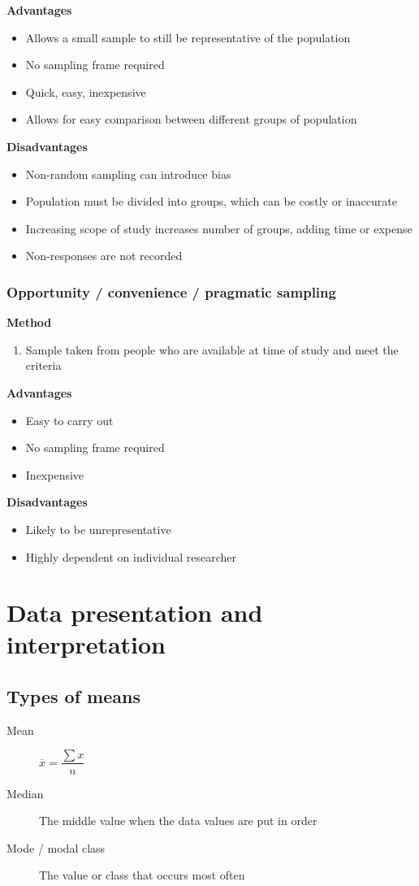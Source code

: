 \documentclass[A4paper, 11pt]{article}
\begin{document}
	\textbf{Advantages}
	\begin{itemize}
		\item Allows a small sample to still be representative of the population
		\item No sampling frame required
		\item Quick, easy, inexpensive
		\item Allows for easy comparison between different groups of population
	\end{itemize}
	\textbf{Disadvantages}
	\begin{itemize}
		\item Non-random sampling can introduce bias
		\item Population must be divided into groups, which can be costly or inaccurate
		\item Increasing scope of study increases number of groups, adding time or expense
		\item Non-responses are not recorded
	\end{itemize}
	
		\subsubsection{Opportunity / convenience / pragmatic sampling}
	\textbf{Method}
	\begin{enumerate}
		\item Sample taken from people who are available at time of study and meet the criteria
	\end{enumerate}
	\textbf{Advantages}
	\begin{itemize}
		\item Easy to carry out
		\item No sampling frame required
		\item Inexpensive
	\end{itemize}
	\textbf{Disadvantages}
	\begin{itemize}
		\item Likely to be unrepresentative
		\item Highly dependent on individual researcher
	\end{itemize}
	
	\pagebreak
	
	\section{Data presentation and interpretation}
	\subsection{Types of means}
	\begin{description}
		\item[Mean] $\overline{x}=\dfrac{\sum x}{n}$
		\item[Median] The middle value when the data values are put in order
		\item[Mode / modal class] The value or class that occurs most often
	\end{description}
	
\end{document}

